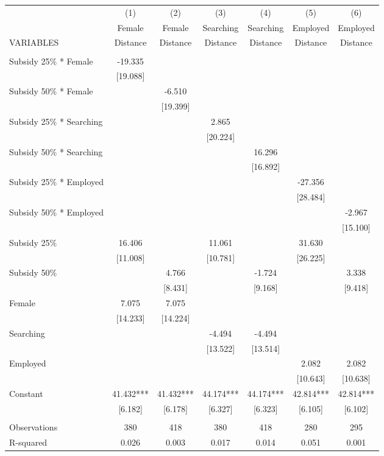\begin{tabular}{lcccccc} \hline
 & (1) & (2) & (3) & (4) & (5) & (6) \\
 & Female & Female & Searching & Searching & Employed & Employed \\
VARIABLES & Distance & Distance & Distance & Distance & Distance & Distance \\ \hline
 &  &  &  &  &  &  \\
Subsidy 25\% * Female & -19.335 &  &  &  &  &  \\
 & [19.088] &  &  &  &  &  \\
Subsidy 50\% * Female &  & -6.510 &  &  &  &  \\
 &  & [19.399] &  &  &  &  \\
Subsidy 25\% * Searching &  &  & 2.865 &  &  &  \\
 &  &  & [20.224] &  &  &  \\
Subsidy 50\% * Searching &  &  &  & 16.296 &  &  \\
 &  &  &  & [16.892] &  &  \\
Subsidy 25\% * Employed &  &  &  &  & -27.356 &  \\
 &  &  &  &  & [28.484] &  \\
Subsidy 50\% * Employed &  &  &  &  &  & -2.967 \\
 &  &  &  &  &  & [15.100] \\
Subsidy 25\% & 16.406 &  & 11.061 &  & 31.630 &  \\
 & [11.008] &  & [10.781] &  & [26.225] &  \\
Subsidy 50\% &  & 4.766 &  & -1.724 &  & 3.338 \\
 &  & [8.431] &  & [9.168] &  & [9.418] \\
Female & 7.075 & 7.075 &  &  &  &  \\
 & [14.233] & [14.224] &  &  &  &  \\
Searching &  &  & -4.494 & -4.494 &  &  \\
 &  &  & [13.522] & [13.514] &  &  \\
Employed &  &  &  &  & 2.082 & 2.082 \\
 &  &  &  &  & [10.643] & [10.638] \\
Constant & 41.432*** & 41.432*** & 44.174*** & 44.174*** & 42.814*** & 42.814*** \\
 & [6.182] & [6.178] & [6.327] & [6.323] & [6.105] & [6.102] \\
 &  &  &  &  &  &  \\
Observations & 380 & 418 & 380 & 418 & 280 & 295 \\
 R-squared & 0.026 & 0.003 & 0.017 & 0.014 & 0.051 & 0.001 \\ \hline
\end{tabular}
